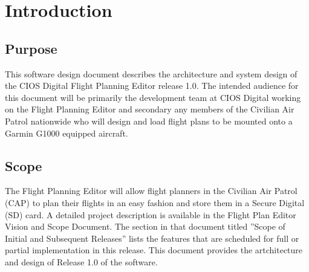 \documentclass[12pt, letterpaper]{article}
\begin{document}
\newpage
\tableofcontents
\newpage

\pagestyle{style1}
\setcounter{page}{1}

\section{Introduction}
  \subsection{Purpose}
    This software design document describes the architecture and system design of the CIOS Digital Flight Planning Editor release 1.0.
    The intended audience for this document will be primarily the development team at CIOS Digital working on the Flight Planning Editor and secondary any members of the Civilian Air Patrol nationwide who will design and load flight plans to be mounted onto a Garmin G1000 equipped aircraft.

  \subsection{Scope}
    The Flight Planning Editor will allow flight planners in the Civilian Air Patrol (CAP) to plan their flights in an easy fashion and store them in a Secure Digital (SD) card. A detailed project description is available in the Flight Plan Editor Vision and Scope Document. The section in that document titled ”Scope of Initial and Subsequent Releases” lists the features that are scheduled for full or partial implementation in this release.
    This document provides the artchitecture and design of Release 1.0 of the software.

\end{document}
